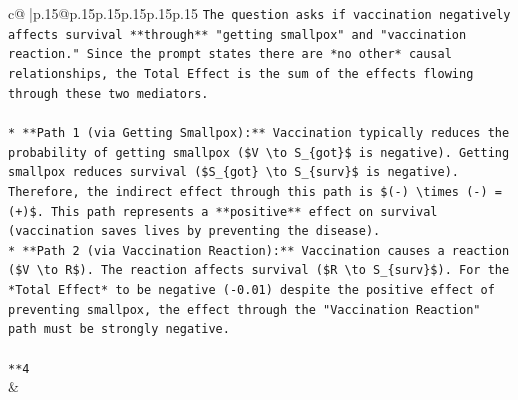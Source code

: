 \documentclass{article}
\begin{document}
{\begin{supertabular}{c@{$\;$}|p{.15\linewidth}@{}p{.15\linewidth}p{.15\linewidth}p{.15\linewidth}p{.15\linewidth}p{.15\linewidth}}
{{{\texttt{The question asks if vaccination negatively affects survival **through** "getting smallpox" and "vaccination reaction." Since the prompt states there are *no other* causal relationships, the Total Effect is the sum of the effects flowing through these two mediators.} \\
\\ 
\texttt{*   **Path 1 (via Getting Smallpox):** Vaccination typically reduces the probability of getting smallpox (\$V \textbackslash{}to S\_\{got\}\$ is negative). Getting smallpox reduces survival (\$S\_\{got\} \textbackslash{}to S\_\{surv\}\$ is negative). Therefore, the indirect effect through this path is \$({-}) \textbackslash{}times ({-}) = (+)\$. This path represents a **positive** effect on survival (vaccination saves lives by preventing the disease).} \\
\texttt{*   **Path 2 (via Vaccination Reaction):** Vaccination causes a reaction (\$V \textbackslash{}to R\$). The reaction affects survival (\$R \textbackslash{}to S\_\{surv\}\$). For the *Total Effect* to be negative ({-}0.01) despite the positive effect of preventing smallpox, the effect through the "Vaccination Reaction" path must be strongly negative.} \\
\\ 
\texttt{**4} \\
            }
        }
    }
    & \\ \\


\end{supertabular}}
\end{document}
